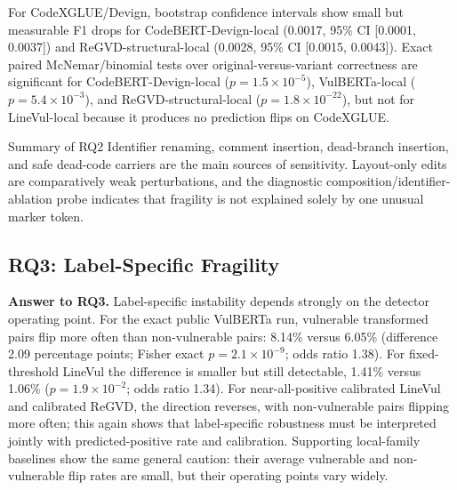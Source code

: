 \documentclass[a4paper,fleqn]{cas-dc}
\begin{document}
\begin{table}[t]
  \centering
  \caption{Composition and identifier-renaming ablation diagnostics.}
  \label{tab:composition-ablation}
\end{table}

For CodeXGLUE/Devign, bootstrap confidence intervals show small but measurable
F1 drops for CodeBERT-Devign-local (0.0017, 95\% CI [0.0001, 0.0037]) and
ReGVD-structural-local (0.0028, 95\% CI [0.0015, 0.0043]). Exact paired
McNemar/binomial tests over original-versus-variant correctness are significant
for CodeBERT-Devign-local ($p=1.5\times 10^{-5}$), VulBERTa-local
($p=5.4\times 10^{-3}$), and ReGVD-structural-local
($p=1.8\times 10^{-22}$), but not for LineVul-local because it produces no
prediction flips on CodeXGLUE.

\begin{rqsummarybox}{Summary of RQ2}
Identifier renaming, comment insertion, dead-branch insertion, and safe
dead-code carriers are the main sources of sensitivity. Layout-only edits are
comparatively weak perturbations, and the diagnostic
composition/identifier-ablation probe indicates that fragility is not explained
solely by one unusual marker token.
\end{rqsummarybox}

\subsection{RQ3: Label-Specific Fragility}

\textbf{Answer to RQ3.} Label-specific instability depends strongly on the
detector operating point. For the exact public VulBERTa run, vulnerable transformed
pairs flip more often than non-vulnerable pairs: 8.14\% versus 6.05\%
(difference 2.09 percentage points; Fisher exact $p=2.1\times 10^{-9}$; odds
ratio 1.38). For fixed-threshold LineVul the difference is smaller but still
detectable, 1.41\% versus 1.06\% ($p=1.9\times 10^{-2}$; odds ratio 1.34).
For near-all-positive calibrated LineVul and calibrated ReGVD, the direction
reverses, with non-vulnerable pairs flipping more often; this again shows that
label-specific robustness must be interpreted jointly with predicted-positive
rate and calibration. Supporting local-family baselines show the same general
caution: their average vulnerable and non-vulnerable flip rates are small, but
their operating points vary widely.
\end{document}
